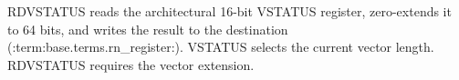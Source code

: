 RDVSTATUS reads the architectural 16-bit VSTATUS register, zero-extends it to 64 bits, and writes the result to the destination (:term:base.terms.rn_register:). VSTATUS selects the current vector length. RDVSTATUS requires the vector extension.
